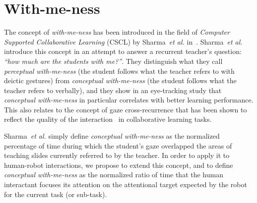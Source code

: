 \documentclass{sig-alternate}
\newcommand{\etal}{\textit{et al.}\xspace}
\begin{document}

\section{With-me-ness}

The concept of \emph{with-me-ness} has been introduced in the field of
\emph{Computer Supported Collaborative Learning} (CSCL) by Sharma~\etal
in~\cite{sharma2014me}. Sharma~\etal introduce this concept in an attempt to
answer a recurrent teacher's question: {\it ``how much are the students with
me?''}. They distinguish what they call \emph{perceptual with-me-ness} (the
student follows what the teacher refers to with deictic gestures) from
\emph{conceptual with-me-ness} (the student follows what the teacher refers to
verbally), and they show in an eye-tracking study that \emph{conceptual
with-me-ness} in particular correlates with better learning performance. This
also relates to the concept of gaze cross-recurrence that has been shown to
reflect the quality of the interaction~\cite{jermann2012effects} in
collaborative learning tasks.

Sharma~\etal simply define \emph{conceptual with-me-ness} as the normalized
percentage of time during which the student's gaze overlapped the areas of
teaching slides currently referred to by the teacher.
In order to apply it to human-robot interactions, we propose to extend this
concept, and to define \emph{conceptual with-me-ness} as the normalized
ratio of time that the human interactant focuses its attention on the
attentional target expected by the robot for the current task (or sub-task).
\end{document}
